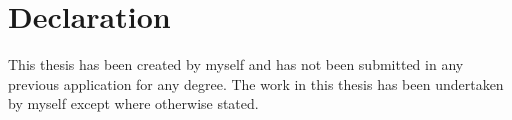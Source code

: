 
\section*{Declaration}

This thesis has been created by myself and has not been submitted in any previous application for any degree. The work in this thesis has been undertaken by myself except where otherwise stated.

\pagebreak